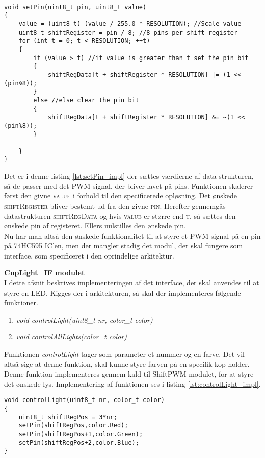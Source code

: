 \documentclass[Softwaredesign/Softwaredesign_main.tex]{subfiles}
\begin{document}
\begin{lstlisting}[caption={Implementeringen af setPin}, label={lst:setPin_impl},
style=customc]

void setPin(uint8_t pin, uint8_t value)
{
    value = (uint8_t) (value / 255.0 * RESOLUTION); //Scale value
    uint8_t shiftRegister = pin / 8; //8 pins per shift register
    for (int t = 0; t < RESOLUTION; ++t)
    {
        if (value > t) //if value is greater than t set the pin bit
        {
            shiftRegData[t + shiftRegister * RESOLUTION] |= (1 << (pin%8));
        }
        else //else clear the pin bit
        {
            shiftRegData[t + shiftRegister * RESOLUTION] &= ~(1 << (pin%8));
        }
        
    }
}
\end{lstlisting}

Det er i denne listing \ref{lst:setPin_impl} der sættes værdierne af data strukturen, så de passer med det PWM-signal, der bliver lavet på pins. Funktionen skalerer først den givne \textsc{value} i forhold til den specificerede opløsning. Det ønskede \textsc{shiftRegister} bliver bestemt ud fra den givne \textsc{pin}. Herefter gennemgås datastrukturen \textsc{shiftRegData} og hvis \textsc{value} er større end \textsc{t}, så sættes den ønskede pin af registeret. Ellers nulstilles den ønskede pin.
\\Nu har man altså den ønskede funktionalitet til at styre et PWM signal på en pin på 74HC595 IC'en, men der mangler stadig det modul, der skal fungere som interface, som specificeret i den oprindelige arkitektur.

\textbf{CupLight\_IF modulet}\\
I dette afsnit beskrives implementeringen af det interface, der skal anvendes til at styre en LED. Kigges der i arkitekturen, så skal der implementeres følgende funktioner.
\begin{enumerate}
    \item \textit{void controlLight(uint8\_t nr, color\_t color)}
    \item \textit{void controlAllLights(color\_t color)}
\end{enumerate}
Funktionen \textit{controlLight} tager som parameter et nummer og en farve. Det vil altså sige at denne funktion, skal kunne styre farven på en specifik kop holder. Denne funktion implementeres gennem kald til ShiftPWM modulet, for at styre det ønskede lys. Implementering af funktionen ses i listing \ref{lst:controlLight_impl}.

\begin{lstlisting}[caption={Implementeringen af controlLight}, label={lst:controlLight_impl},
style=customc]
void controlLight(uint8_t nr, color_t color)
{
    uint8_t shiftRegPos = 3*nr;
    setPin(shiftRegPos,color.Red);
    setPin(shiftRegPos+1,color.Green);
    setPin(shiftRegPos+2,color.Blue);
}
\end{lstlisting}
\end{document}
